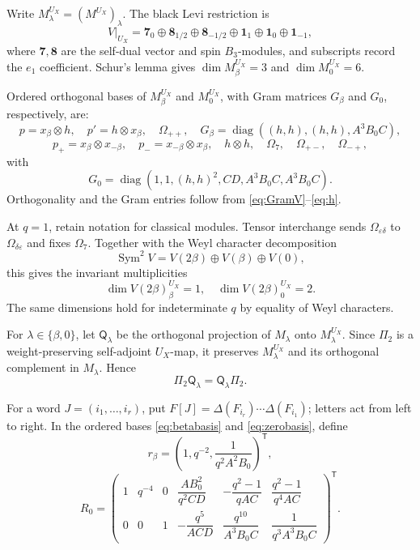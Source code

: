 \documentclass[12pt,reqno]{amsart}
\theoremstyle{plain}
\theoremstyle{definition}
\numberwithin{equation}{section}
\newcommand{\diag}{\operatorname{diag}}
\newcommand{\tens}{\otimes}
\begin{document}
Write $M_\lambda^{U_X}=(M^{U_X})_\lambda$.
The black Levi restriction is
\[
V|_{U_X}
=
\mathbf7_0\oplus\mathbf8_{1/2}\oplus\mathbf8_{-1/2}
\oplus\mathbf1_1\oplus\mathbf1_0\oplus\mathbf1_{-1},
\]
where $\mathbf7,\mathbf8$ are the self-dual vector and spin
$B_3$-modules, and subscripts record the $e_1$ coefficient.
Schur's lemma gives $\dim M_\beta^{U_X}=3$ and
$\dim M_0^{U_X}=6$.

Ordered orthogonal bases of $M_\beta^{U_X}$ and $M_0^{U_X}$,
with Gram matrices $G_\beta$ and $G_0$, respectively, are:
\begin{equation}\label{eq:betabasis}
	p=x_\beta\tens h,\quad
	p'=h\tens x_\beta,\quad
	\Omega_{++},
	\quad G_\beta=\diag((h,h),(h,h),A^3B_0C),
\end{equation}
\begin{equation}\label{eq:zerobasis}
	p_+=x_\beta\tens x_{-\beta},\quad
	p_-=x_{-\beta}\tens x_\beta,\quad
	h\tens h,\quad
	\Omega_7,\quad\Omega_{+-},\quad\Omega_{-+},
\end{equation}
with
\begin{equation}\label{eq:Gzero}
	G_0=\diag(1,1,(h,h)^2,CD,A^3B_0C,A^3B_0C).
\end{equation}
Orthogonality and the Gram entries follow from
\eqref{eq:GramV}--\eqref{eq:h}.

At $q=1$, retain notation for classical modules.
Tensor interchange sends
$\Omega_{\varepsilon\delta}$ to $\Omega_{\delta\varepsilon}$
and fixes $\Omega_7$.
Together with the Weyl character decomposition
\[
\operatorname{Sym}^2V
=V(2\beta)\oplus V(\beta)\oplus V(0),
\]
this gives the invariant multiplicities
\begin{equation}\label{eq:invariantcounts}
	\dim V(2\beta)_\beta^{U_X}=1,\quad
	\dim V(2\beta)_0^{U_X}=2.
\end{equation}
The same dimensions hold for indeterminate $q$ by equality
of Weyl characters.

For $\lambda\in\{\beta,0\}$, let $\mathsf Q_\lambda$ be the
orthogonal projection of $M_\lambda$ onto $M_\lambda^{U_X}$.
Since $\Pi_2$ is a weight-preserving self-adjoint $U_X$-map,
it preserves $M_\lambda^{U_X}$ and its orthogonal complement
in $M_\lambda$. Hence
\begin{equation}\label{eq:commutingprojections}
	\Pi_2\mathsf Q_\lambda=\mathsf Q_\lambda \Pi_2.
\end{equation}

For a word $J=(i_1,\ldots,i_r)$, put
$F[J]=\Delta(F_{i_r})\cdots\Delta(F_{i_1})$;
letters act from left to right.
In the ordered bases \eqref{eq:betabasis}
and \eqref{eq:zerobasis}, define
\begin{equation}\label{eq:rbeta}
	r_\beta
	=
	\left(1,q^{-2},\frac{1}{q^2A^2B_0}\right)^{\mathsf T},
\end{equation}
\begin{equation}\label{eq:Rzero}
	R_0=
	\begin{pmatrix}
		1&q^{-4}&0&
		\dfrac{AB_0^2}{q^2CD}&
		-\dfrac{q^2-1}{qAC}&
		\dfrac{q^2-1}{q^4AC}\\[2mm]
		0&0&1&
		-\dfrac{q^5}{ACD}&
		\dfrac{q^{10}}{A^3B_0C}&
		\dfrac{1}{q^3A^3B_0C}
	\end{pmatrix}^{\mathsf T}.
\end{equation}
\end{document}

